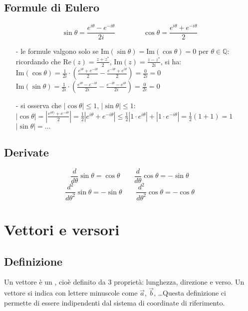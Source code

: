 \documentclass[a4paper]{article}
\newcommand\Real{\text{Re}}
\newcommand\Img{\text{Im}}
\begin{document}
\subsection{Formule di Eulero}
\[\sin \theta = \frac{e^{i\theta}-e^{-i\theta}}{2i} \qquad \qquad \cos \theta = \frac{e^{i\theta}+e^{-i\theta}}{2}\]
\begin{itemize}[topsep=3pt, itemsep=0pt]
	\item[-] le formule valgono solo se \(\Img (\sin \theta) = \Img (\cos \theta) = 0\) per \(\theta \in \mathbb{Q}\): \\
	ricordando che \(\displaystyle \Real (z) = \frac{z + z^*}{2}\), \(\displaystyle \Img (z) = \frac{z - z^*}{2i}\), si ha: \\
	\(\displaystyle \Img (\cos \theta) = \frac{1}{2i} \cdot \left(\frac{e^{i\theta}+e^{-i\theta}}{2} - \frac{e^{-i\theta}+e^{i\theta}}{2}\right) = \frac{0}{2i} = 0\) \\
	\(\displaystyle \Img (\sin \theta) = \frac{1}{2i} \cdot \left(\frac{e^{i\theta}-e^{-i\theta}}{2i} - \frac{e^{-i\theta}-e^{i\theta}}{2i}\right) = \frac{0}{2i} = 0\)
	\item[-] si osserva che \(\left|\cos \theta\right| \leq 1\), \(\left|\sin \theta\right| \leq 1\): \\
	\(\displaystyle \left|\cos \theta\right| = \left|\frac{e^{i\theta)}+e^{-i\theta}}{2}\right| = \frac{1}{2}\left|e^{i\theta} + e^{-i\theta}\right| \leq \frac{1}{2}\left|1 \cdot e^{i\theta}\right| + \left|1 \cdot e^{-i\theta}\right|= \frac{1}{2} (1+1) = 1\) \\
	\(\displaystyle \left|\sin \theta\right| = \dots\)
\end{itemize}

\subsection{Derivate}
\[\frac{d}{d\theta} \sin \theta = \cos \theta \qquad \frac{d}{d\theta} \cos \theta = -\sin \theta\]
\[\frac{d^2}{d\theta^2} \sin \theta = -\sin \theta \qquad \frac{d^2}{d\theta^2} \cos \theta = -\cos \theta\]

\newpage


\section{Vettori e versori}
\subsection{Definizione}
Un vettore è un , cioè definito da 3 proprietà: lunghezza, direzione e verso. Un vettore si indica con
lettere minuscole come \(\vec{a}\), \(\vec{b}\), \dots Questa definizione ci permette di essere indipendenti dal sistema di 
coordinate di riferimento.
\end{document}
